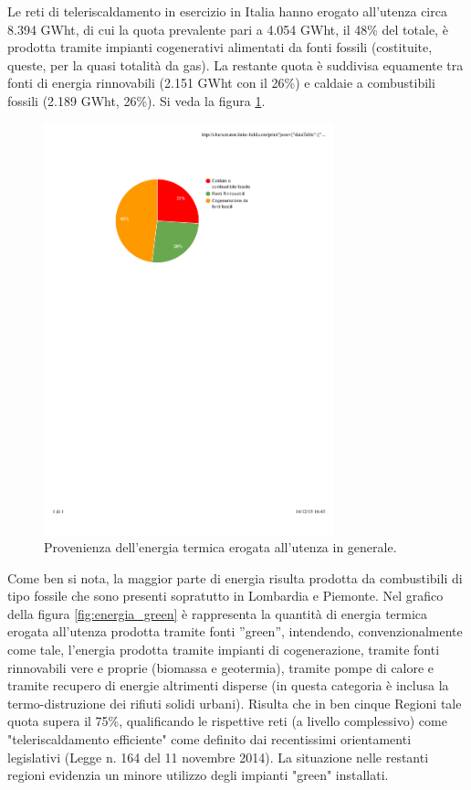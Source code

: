 \documentclass[laurea,oneside,11pt]{USiena_tesiLM}
\begin{document}
Le reti di teleriscaldamento in esercizio in Italia hanno erogato all'utenza circa 8.394 GWht, di cui la quota prevalente pari a 4.054 GWht, il 48\% del totale, è prodotta tramite impianti cogenerativi alimentati da fonti fossili (costituite, queste, per la quasi totalità da gas). La restante quota è suddivisa equamente tra fonti di energia rinnovabili (2.151 GWht con il 26\%) e caldaie a combustibili fossili (2.189 GWht, 26\%). Si veda la figura \ref{fig:torta}.

\begin{figure}[!ht]
\centering
\includegraphics[width=0.75\textwidth]{figure/torta_energia} 
\caption{Provenienza dell'energia termica erogata all'utenza in generale.}
\label{fig:torta}
\end{figure}

Come ben si nota, la maggior parte di energia risulta prodotta da combustibili di tipo fossile che sono presenti sopratutto in Lombardia e Piemonte.
Nel grafico della figura \ref{fig:energia_green} è rappresenta la quantità di energia termica erogata all'utenza prodotta tramite fonti ''green'', intendendo, convenzionalmente come tale, l'energia prodotta tramite impianti di cogenerazione, tramite fonti rinnovabili vere e proprie (biomassa e geotermia), tramite pompe di calore e tramite recupero di energie altrimenti disperse (in questa categoria è inclusa la termo-distruzione dei rifiuti solidi urbani).
Risulta che in ben cinque Regioni tale quota supera il 75\%, qualificando le rispettive reti (a livello complessivo) come "teleriscaldamento efficiente" come definito dai recentissimi orientamenti legislativi (Legge n. 164 del 11 novembre 2014).
La situazione nelle restanti regioni evidenzia un minore utilizzo degli impianti "green" installati.
\end{document}
